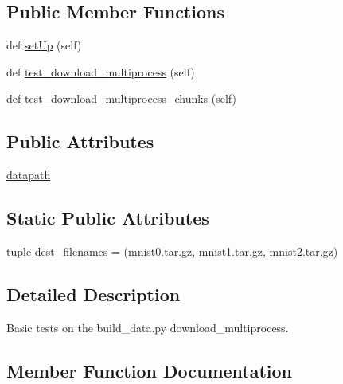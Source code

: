 \subsection*{Public Member Functions}
\begin{DoxyCompactItemize}
\item 
def \hyperlink{classtests_1_1test__build__data_1_1TestBuildData_a778e0feb33f86ce770dc7bf7a3b8a416}{set\+Up} (self)
\item 
def \hyperlink{classtests_1_1test__build__data_1_1TestBuildData_a24ccc6522078dd41dbc5d608bc1297e2}{test\+\_\+download\+\_\+multiprocess} (self)
\item 
def \hyperlink{classtests_1_1test__build__data_1_1TestBuildData_a57a7d34acf8cec7b757605c5659b6e96}{test\+\_\+download\+\_\+multiprocess\+\_\+chunks} (self)
\end{DoxyCompactItemize}
\subsection*{Public Attributes}
\begin{DoxyCompactItemize}
\item 
\hyperlink{classtests_1_1test__build__data_1_1TestBuildData_a4b59ee6d7a834ee32404afe63512db12}{datapath}
\end{DoxyCompactItemize}
\subsection*{Static Public Attributes}
\begin{DoxyCompactItemize}
\item 
tuple \hyperlink{classtests_1_1test__build__data_1_1TestBuildData_ae4a9fc30e48b82a3fce242ea1dfa4b60}{dest\+\_\+filenames} = (\textquotesingle{}mnist0.\+tar.\+gz\textquotesingle{}, \textquotesingle{}mnist1.\+tar.\+gz\textquotesingle{}, \textquotesingle{}mnist2.\+tar.\+gz\textquotesingle{})
\end{DoxyCompactItemize}


\subsection{Detailed Description}
\begin{DoxyVerb}Basic tests on the build_data.py download_multiprocess.
\end{DoxyVerb}
 

\subsection{Member Function Documentation}
\mbox{\label{classtests_1_1test__build__data_1_1TestBuildData_a778e0feb33f86ce770dc7bf7a3b8a416}} 
